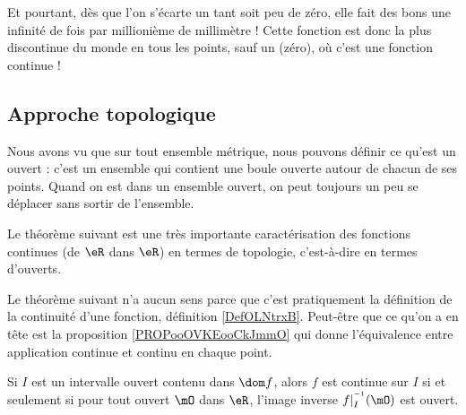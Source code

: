 Et pourtant, dès que l'on s'écarte un tant soit peu de zéro, elle fait des bons une infinité de fois par millionième de millimètre ! Cette fonction est donc la plus discontinue du monde en tous les points, sauf un (zéro), où c'est une fonction continue !

\subsection{Approche topologique}

Nous avons vu que sur tout ensemble métrique, nous pouvons définir ce qu'est un ouvert : c'est un ensemble qui contient une boule ouverte autour de chacun de ses points. Quand on est dans un ensemble ouvert, on peut toujours un peu se déplacer sans sortir de l'ensemble.

Le théorème suivant est une très importante caractérisation des fonctions continues (de \( \eR\) dans \( \eR\)) en termes de topologie, c'est-à-dire en termes d'ouverts.

\begin{probleme}
	Le théorème suivant n'a aucun sens parce que c'est pratiquement la définition de la continuité d'une fonction, définition \ref{DefOLNtrxB}. Peut-être que ce qu'on a en tête est la proposition \ref{PROPooOVKEooCkJmmO} qui donne l'équivalence entre application continue et continu en chaque point.
\end{probleme}

\begin{theorem}     \label{ThoContInvOuvert}
	Si \( I\) est un intervalle ouvert contenu dans \( \dom f\), alors \( f\) est continue sur \( I\) si et seulement si pour tout ouvert \( \mO\) dans \( \eR\), l'image inverse \( f|_I^{^{-1}}(\mO)\) est ouvert.
\end{theorem}

